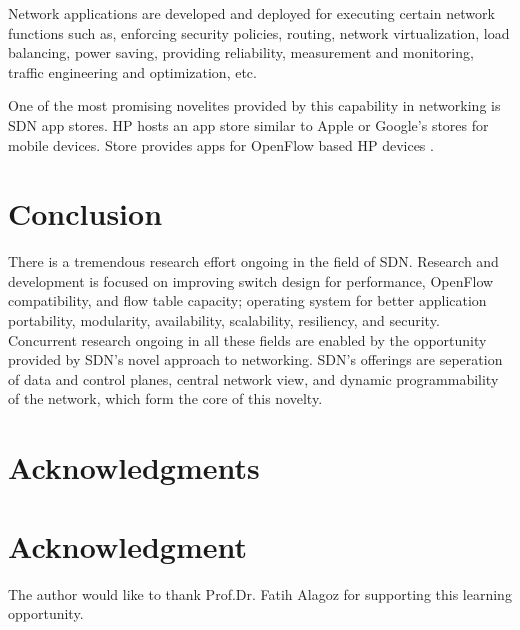 \documentclass[12pt,journal,compsoc]{IEEEtran}
\begin{document}
Network applications are developed and deployed for executing 
certain network functions such as, 
enforcing security policies, routing, network virtualization, load balancing,
 power saving, providing reliability, measurement and monitoring,
 traffic engineering and optimization, etc.

One of the most promising novelites provided by this capability in 
networking is SDN app stores. HP hosts an app store similar to Apple or
 Google's stores for mobile devices. Store provides apps for OpenFlow
 based HP devices \cite{hede}.
\section{Conclusion}
There is a tremendous research effort ongoing in the field of SDN. Research
 and development is focused on improving switch design for performance, 
OpenFlow compatibility, and flow table capacity; operating system for better
 application portability, modularity, availability, scalability, resiliency, 
and security. Concurrent research ongoing in all these fields are enabled by
 the opportunity provided by SDN's novel approach to networking. SDN's 
offerings are seperation of data and control planes, central network view, and 
dynamic programmability of the network, which form the core of this novelty.

\ifCLASSOPTIONcompsoc
  \section*{Acknowledgments}
\else
  \section*{Acknowledgment}
\fi


The author would like to thank Prof.Dr. Fatih Alagoz for supporting this learning opportunity.


\ifCLASSOPTIONcaptionsoff
  \newpage
\fi


\end{document}
